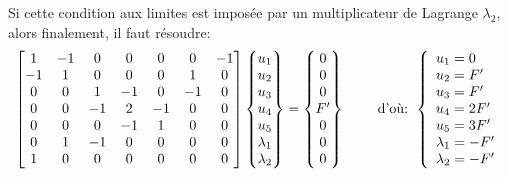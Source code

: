 Si cette condition aux limites est imposée par un multiplicateur de Lagrange $\lambda_2$, alors finalement, il faut résoudre:
\begin{equation}
\MM*{1&-1&0&0&0&0&-1 \\ -1&1&0&0&0&1&0 \\ 0&0&1&-1&0&-1&0\\ 
0&0&-1&2&-1&0&0\\ 0&0&0&-1&1&0&0 \\ 0&1&-1&0&0&0&0 \\ 1&0&0&0&0&0&0}
\VV*{u_1\\u_2\\u_3\\u_4\\ u_5\\ \lambda_1 \\ \lambda_2}
=
\VV*{0\\0\\0\\F' \\ 0 \\ 0 \\ 0}
\qquad \text{ d'où: } 
\left\{\begin{array}{l} u_1=0 \\ u_2=F' \\ u_3=F' \\ u_4=2F' \\ u_5=3F' \\ \lambda_1 = -F' \\ \lambda_2 = -F' \end{array}\right.
\end{equation}